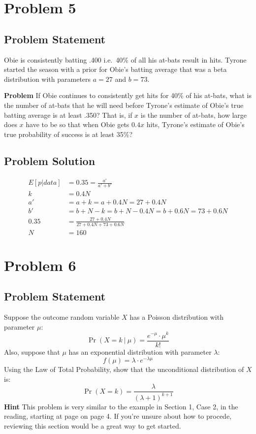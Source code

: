 \documentclass[12pt]{article}
\theoremstyle{definition}
\begin{document}
\newpage
\section*{Problem 5}

\subsection*{Problem Statement}

Obie is consistently batting .400 i.e.\ 40\% of all his at-bats result in hits. Tyrone started the season with a prior for Obie's batting average that was a beta distribution with parameters $a = 27$ and $b = 73$.

\bigskip
\noindent
{\bf Problem} If Obie continues to consistently get hits for 40\% of his at-bats, what is the number of at-bats that he will need before Tyrone's estimate of Obie's true batting average is at least .350? That is, if $x$ is the number of at-bats, how large does $x$ have to be so that when Obie gets $0.4x$ hits, Tyrone's estimate of Obie's true probability of success is at least 35\%?


\subsection*{Problem Solution}
\begin{align*}
E[p|data] &= 0.35 = \frac{a'}{a' + b'}\\
k &= 0.4N\\
a' &= a + k = a + 0.4N = 27 + 0.4N\\
b' &= b + N - k = b + N - 0.4N = b + 0.6N = 73 + 0.6N\\
0.35 &= \frac{27 + 0.4N}{27 + 0.4N + 73 + 0.6N}\\
N &= 160
\end{align*}



\newpage
\section*{Problem 6}

\subsection*{Problem Statement}

Suppose the outcome random variable $X$ has a Poisson distribution with parameter $\mu$:
$$
\Pr(X = k\ |\ \mu) = \frac{ e^{-\mu} \cdot \mu^k}{k!}
$$
Also, suppose that $\mu$ has an exponential distribution with parameter $\lambda$:
$$
f(\mu) = \lambda \cdot e^{-\lambda \mu}
$$
Using the Law of Total Probability, show that the unconditional distribution of $X$ is:
$$
\Pr( X = k ) = \frac{ \lambda }{(\lambda + 1)^{k+1}}
$$
{\bf Hint} This problem is very similar to the example in Section 1, Case 2, in the reading, starting at page on page 4. If you're unsure about how to procede, reviewing this section would be a great way to get started.
\end{document}
